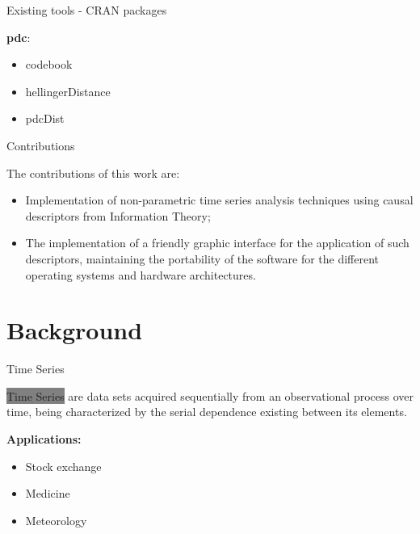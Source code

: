 \documentclass[10pt]{beamer}
\begin{document}
\begin{frame}[fragile]{Existing tools - CRAN packages}
    
    \textbf{pdc}:
            \begin{itemize}
                \item codebook
                \item hellingerDistance
                \item pdcDist
            \end{itemize}

\end{frame}

\begin{frame}{Contributions}

        The contributions of this work are:
        
        \begin{itemize}
            \item Implementation of non-parametric time series analysis techniques using causal descriptors from Information Theory;
            \item The implementation of a friendly graphic interface for the application of such descriptors, maintaining the portability of the software for the different operating systems and hardware architectures.
        \end{itemize}

\end{frame}

\section{Background}

\begin{frame}[fragile]{Time Series}

     \colorbox{gray}{Time Series} are data sets acquired sequentially from an observational process over time, being characterized by the serial dependence existing between its elements.
     
    \textbf{Applications:}
    
    \begin{itemize}
        \item Stock exchange
        \item Medicine
        \item Meteorology
    \end{itemize}

\end{frame}
\end{document}
